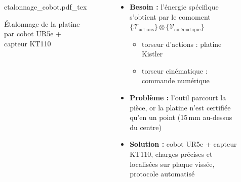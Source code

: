 \documentclass{style/presentation}
\begin{document}
\begin{frame}

    \begin{columns}[c]
        \begin{figure}
            \centering
            \def\svgwidth{\textwidth}
            {etalonnage_cobot.pdf_tex}
            \caption{Étalonnage de la platine par cobot UR5e + capteur KT110}
        \end{figure}
        \begin{itemize}
            \item \textbf{Besoin :} l'énergie spécifique s'obtient par le comoment
                  $\{\mathcal{T}_{\text{actions}}\}\otimes\{\mathcal{V}_{\text{cinématique}}\}$
                  \begin{itemize}
                      \item torseur d'actions : platine Kistler
                      \item torseur cinématique : commande numérique
                  \end{itemize}
            \item \textbf{Problème :} l'outil parcourt la pièce, or la platine n'est certifiée qu'\alert{en un point} (15\,mm au-dessus du centre)
            \item \textbf{Solution :} cobot UR5e + capteur KT110, charges précises et localisées sur plaque vissée, protocole automatisé
        \end{itemize}
    \end{columns}
\end{frame}
\end{document}
